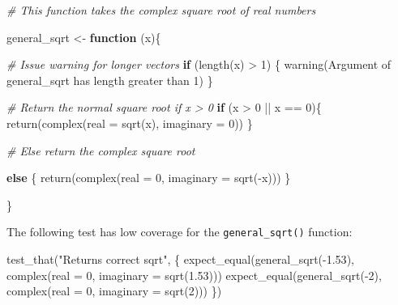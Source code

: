 \documentclass[
]{book}
\newenvironment{Shaded}{\begin{snugshade}}{\end{snugshade}}
\newcommand{\AttributeTok}[1]{\textcolor[rgb]{0.77,0.63,0.00}{#1}}
\newcommand{\CommentTok}[1]{\textcolor[rgb]{0.56,0.35,0.01}{\textit{#1}}}
\newcommand{\ControlFlowTok}[1]{\textcolor[rgb]{0.13,0.29,0.53}{\textbf{#1}}}
\newcommand{\DecValTok}[1]{\textcolor[rgb]{0.00,0.00,0.81}{#1}}
\newcommand{\FloatTok}[1]{\textcolor[rgb]{0.00,0.00,0.81}{#1}}
\newcommand{\FunctionTok}[1]{\textcolor[rgb]{0.00,0.00,0.00}{#1}}
\newcommand{\NormalTok}[1]{#1}
\newcommand{\OtherTok}[1]{\textcolor[rgb]{0.56,0.35,0.01}{#1}}
\newcommand{\SpecialCharTok}[1]{\textcolor[rgb]{0.00,0.00,0.00}{#1}}
\newcommand{\StringTok}[1]{\textcolor[rgb]{0.31,0.60,0.02}{#1}}
\begin{document}
\begin{Shaded}
\begin{Highlighting}[]
\CommentTok{\# This function takes the complex square root of real numbers}

\NormalTok{general\_sqrt }\OtherTok{\textless{}{-}} \ControlFlowTok{function}\NormalTok{ (x)\{}

  \CommentTok{\# Issue warning for longer vectors}
  \ControlFlowTok{if}\NormalTok{ (}\FunctionTok{length}\NormalTok{(x) }\SpecialCharTok{\textgreater{}} \DecValTok{1}\NormalTok{) \{}
    \FunctionTok{warning}\NormalTok{(}\StringTok{\textquotesingle{}Argument of general\_sqrt has length greater than 1\textquotesingle{}}\NormalTok{)}
\NormalTok{  \}}

  \CommentTok{\# Return the normal square root if x \textgreater{} 0}
  \ControlFlowTok{if}\NormalTok{ (x }\SpecialCharTok{\textgreater{}} \DecValTok{0} \SpecialCharTok{||}\NormalTok{ x }\SpecialCharTok{==} \DecValTok{0}\NormalTok{)\{}
    \FunctionTok{return}\NormalTok{(}\FunctionTok{complex}\NormalTok{(}\AttributeTok{real =} \FunctionTok{sqrt}\NormalTok{(x), }\AttributeTok{imaginary =} \DecValTok{0}\NormalTok{))}
\NormalTok{  \}}

  \CommentTok{\# Else return the complex square root}

  \ControlFlowTok{else}\NormalTok{ \{}
    \FunctionTok{return}\NormalTok{(}\FunctionTok{complex}\NormalTok{(}\AttributeTok{real =} \DecValTok{0}\NormalTok{, }\AttributeTok{imaginary =} \FunctionTok{sqrt}\NormalTok{(}\SpecialCharTok{{-}}\NormalTok{x)))}
\NormalTok{  \}}

\NormalTok{\}}
\end{Highlighting}
\end{Shaded}

The following test has low coverage for the \texttt{general\_sqrt()} function:

\begin{Shaded}
\begin{Highlighting}[]
\FunctionTok{test\_that}\NormalTok{(}\StringTok{"Returns correct sqrt"}\NormalTok{, \{}
  \FunctionTok{expect\_equal}\NormalTok{(}\FunctionTok{general\_sqrt}\NormalTok{(}\SpecialCharTok{{-}}\FloatTok{1.53}\NormalTok{), }\FunctionTok{complex}\NormalTok{(}\AttributeTok{real =} \DecValTok{0}\NormalTok{, }\AttributeTok{imaginary =} \FunctionTok{sqrt}\NormalTok{(}\FloatTok{1.53}\NormalTok{)))}
  \FunctionTok{expect\_equal}\NormalTok{(}\FunctionTok{general\_sqrt}\NormalTok{(}\SpecialCharTok{{-}}\DecValTok{2}\NormalTok{), }\FunctionTok{complex}\NormalTok{(}\AttributeTok{real =} \DecValTok{0}\NormalTok{, }\AttributeTok{imaginary =} \FunctionTok{sqrt}\NormalTok{(}\DecValTok{2}\NormalTok{)))}
\NormalTok{\})}
\end{Highlighting}
\end{Shaded}
\end{document}
